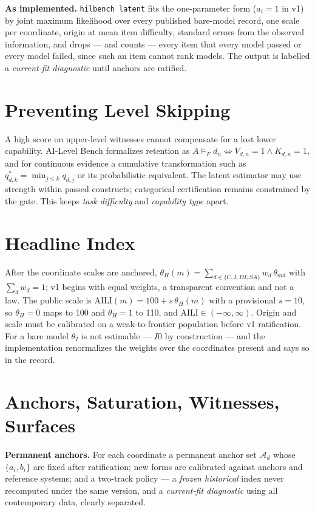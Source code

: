 \documentclass[11pt]{article}
\theoremstyle{definition}
\begin{document}
\textbf{As implemented.} \texttt{hilbench latent} fits the one-parameter form ($a_i = 1$ in v1) by joint maximum likelihood over every published bare-model record, one scale per coordinate, origin at mean item difficulty, standard errors from the observed information, and drops --- and counts --- every item that every model passed or every model failed, since such an item cannot rank models. The output is labelled a \emph{current-fit diagnostic} until anchors are ratified.

\section{Preventing Level Skipping}\label{sec:skip}

A high score on upper-level witnesses cannot compensate for a lost lower capability. AI-Level Bench formalizes retention as $A \models_F d_n \iff V_{d,n} = 1 \wedge K_{d,n} = 1$, and for continuous evidence a cumulative transformation such as $q^{*}_{d,k} = \min_{j \le k} q_{d,j}$ or its probabilistic equivalent. The latent estimator may use strength within passed constructs; categorical certification remains constrained by the gate. This keeps \emph{task difficulty} and \emph{capability type} apart.

\section{Headline Index}\label{sec:headline}

After the coordinate scales are anchored, $\theta_H(m) = \sum_{d \in \{C, I, DI, SA\}} w_d\,\theta_{md}$ with $\sum_d w_d = 1$; v1 begins with equal weights, a transparent convention and not a law. The public scale is $\mathrm{AILI}(m) = 100 + s\,\theta_H(m)$ with a provisional $s = 10$, so $\theta_H = 0$ maps to 100 and $\theta_H = 1$ to 110, and $\mathrm{AILI} \in (-\infty, \infty)$. Origin and scale must be calibrated on a weak-to-frontier population before v1 ratification. For a bare model $\theta_I$ is not estimable --- $I0$ by construction --- and the implementation renormalizes the weights over the coordinates present and says so in the record.

\section{Anchors, Saturation, Witnesses, Surfaces}\label{sec:anchors}

\textbf{Permanent anchors.} For each coordinate a permanent anchor set $\mathcal A_d$ whose $\{a_i, b_i\}$ are fixed after ratification; new forms are calibrated against anchors and reference systems; and a two-track policy --- a \emph{frozen historical} index never recomputed under the same version, and a \emph{current-fit diagnostic} using all contemporary data, clearly separated.
\end{document}
